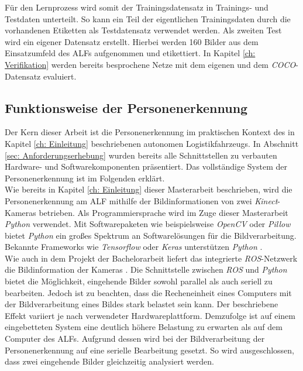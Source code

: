 		Für den Lernprozess wird somit der Trainingsdatensatz in Trainings- und Testdaten unterteilt. So kann ein Teil der eigentlichen Trainingsdaten durch die vorhandenen Etiketten als Testdatensatz verwendet werden. Als zweiten Test wird ein eigener Datensatz erstellt. Hierbei werden 160 Bilder aus dem Einsatzumfeld des ALFs aufgenommen und etikettiert. In Kapitel \ref{ch: Verifikation} werden bereits besprochene Netze mit dem eigenen und dem \textit{COCO}-Datensatz evaluiert.
	
		
	\subsection{Funktionsweise der Personenerkennung}
	\label{sec: Funktionsweise des Gesamtsystems}
	
	Der Kern dieser Arbeit ist die Personenerkennung im praktischen Kontext des in Kapitel \ref{ch: Einleitung} beschriebenen autonomen Logistikfahrzeugs. In Abschnitt \ref{sec: Anforderungserhebung} wurden bereits alle Schnittstellen zu verbauten Hardware- und Softwarekomponenten präsentiert. Das vollständige System der Personenerkennung ist im Folgenden erklärt.\\
	
	Wie bereits in Kapitel \ref{ch: Einleitung} dieser Masterarbeit beschrieben, wird die Personenerkennung am ALF mithilfe der Bildinformationen von zwei \textit{Kinect}-Kameras betrieben. Als Programmiersprache wird im Zuge dieser Masterarbeit \textit{Python} verwendet. Mit Softwarepaketen wie beispielsweise \textit{OpenCV} oder \textit{Pillow} bietet \textit{Python} ein großes Spektrum an Softwarelösungen für die Bildverarbeitung. Bekannte Frameworks wie \textit{Tensorflow} oder \textit{Keras} unterstützen \textit{Python} \cite{tensorflow, keraspython}.\\
	
	Wie auch in dem Projekt der Bachelorarbeit liefert das integrierte \textit{ROS}-Netzwerk die Bildinformation der Kameras \cite{Bachelorarbeit}. Die Schnittstelle zwischen \textit{ROS} und \textit{Python} bietet die Möglichkeit, eingehende Bilder sowohl parallel als auch seriell zu bearbeiten. Jedoch ist zu beachten, dass die Recheneinheit eines Computers mit der Bildverarbeitung eines Bildes stark belastet sein kann. Der beschriebene Effekt variiert je nach verwendeter Hardwareplattform. Demzufolge ist auf einem eingebetteten System eine deutlich höhere Belastung zu erwarten als auf dem Computer des ALFs. Aufgrund dessen wird bei der Bildverarbeitung der Personenerkennung auf eine serielle Bearbeitung gesetzt. So wird ausgeschlossen, dass zwei eingehende Bilder gleichzeitig analysiert werden.\\
	

